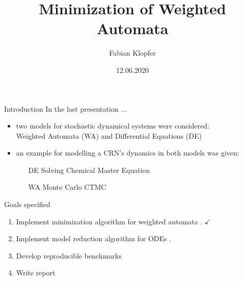 \documentclass[rgb, pdf]{beamer}
\title{Minimization of Weighted Automata}
\author{Fabian Klopfer}
\date{12.06.2020}
\institute{Modelling of Complex Self-Organizing Systems Group}
\begin{document}
    \begin{frame}
        \titlepage
    \end{frame}

    \begin{frame}{Introduction}
        In the last presentation $\dots$ \\ \vspace{0.5cm}
        \begin{itemize}
            \item two models for stochastic dynamical systems were considered: \\ \vspace{0.2cm} 
                Weighted Automata (WA) and Differential Equations (DE)\\ \vspace{0.8cm} 
            \item an example for modelling a CRN's dynamics in both models was given: \\
            \vspace{0.3cm} 
            \begin{itemize}
             \item[DE] Solving Chemical Master Equation 
             \item[WA] Monte Carlo CTMC
            \end{itemize}
        \end{itemize}
    \end{frame}
    
    \begin{frame}{Goals specified}
        \begin{enumerate}
            \item Implement minimization algorithm for weighted automata \autocite{Kiefer2013OnTC}. {\Huge $\checkmark$ }  \\ \vspace{0.7cm}
            \item Implement model reduction algorithm for ODEs \autocite{Cardelli2017MaximalAO}.  \\ \vspace{0.7cm}
            \item Develop reproducible benchmarks  \\ \vspace{0.7cm}
            \item Write report \\
        \end{enumerate}
    \end{frame}
    
\end{document}
